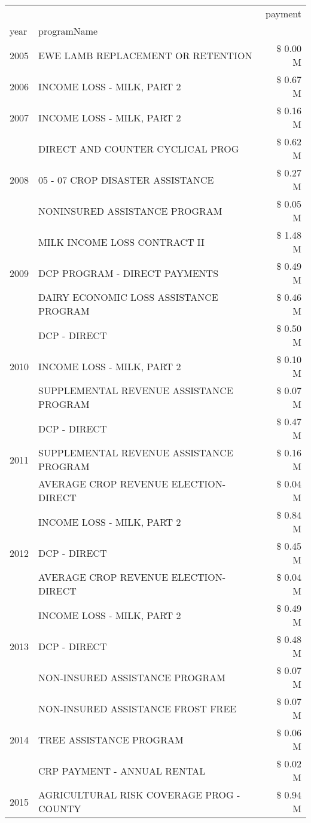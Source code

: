 \begin{tabular}{llr}
\toprule
 &  & payment \\
year & programName &  \\
\midrule
2005 & EWE LAMB REPLACEMENT OR RETENTION & \$ 0.00 M \\
\cline{1-3}
2006 & INCOME LOSS - MILK, PART 2 & \$ 0.67 M \\
\cline{1-3}
2007 & INCOME LOSS - MILK, PART 2 & \$ 0.16 M \\
\cline{1-3}
\multirow[t]{3}{*}{2008} & DIRECT AND COUNTER CYCLICAL PROG & \$ 0.62 M \\
 & 05 - 07 CROP DISASTER ASSISTANCE & \$ 0.27 M \\
 & NONINSURED ASSISTANCE PROGRAM & \$ 0.05 M \\
\cline{1-3}
\multirow[t]{3}{*}{2009} & MILK INCOME LOSS CONTRACT II & \$ 1.48 M \\
 & DCP PROGRAM - DIRECT PAYMENTS & \$ 0.49 M \\
 & DAIRY ECONOMIC LOSS ASSISTANCE PROGRAM & \$ 0.46 M \\
\cline{1-3}
\multirow[t]{3}{*}{2010} & DCP - DIRECT & \$ 0.50 M \\
 & INCOME LOSS - MILK, PART 2 & \$ 0.10 M \\
 & SUPPLEMENTAL REVENUE ASSISTANCE PROGRAM & \$ 0.07 M \\
\cline{1-3}
\multirow[t]{3}{*}{2011} & DCP - DIRECT & \$ 0.47 M \\
 & SUPPLEMENTAL REVENUE ASSISTANCE PROGRAM & \$ 0.16 M \\
 & AVERAGE CROP REVENUE ELECTION-DIRECT & \$ 0.04 M \\
\cline{1-3}
\multirow[t]{3}{*}{2012} & INCOME LOSS - MILK, PART 2 & \$ 0.84 M \\
 & DCP - DIRECT & \$ 0.45 M \\
 & AVERAGE CROP REVENUE ELECTION-DIRECT & \$ 0.04 M \\
\cline{1-3}
\multirow[t]{3}{*}{2013} & INCOME LOSS - MILK, PART 2 & \$ 0.49 M \\
 & DCP - DIRECT & \$ 0.48 M \\
 & NON-INSURED ASSISTANCE PROGRAM & \$ 0.07 M \\
\cline{1-3}
\multirow[t]{3}{*}{2014} & NON-INSURED ASSISTANCE FROST FREE & \$ 0.07 M \\
 & TREE ASSISTANCE PROGRAM & \$ 0.06 M \\
 & CRP PAYMENT - ANNUAL RENTAL & \$ 0.02 M \\
\cline{1-3}
\multirow[t]{3}{*}{2015} & AGRICULTURAL RISK COVERAGE PROG - COUNTY & \$ 0.94 M \\

\end{tabular}
